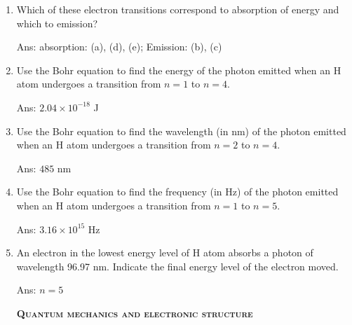 \documentclass[main.tex]{subfiles}
\begin{document}
\begin{multicols*}{2}
\begin{enumerate}
\item Which of these electron transitions correspond to absorption of energy and which to emission?
\begin{enumerate}[label=(\alph*)]\end{enumerate}
  \begin{flushright}\small Ans:  absorption: (a), (d), (e); Emission: (b), (c)  \end{flushright}



\item Use the Bohr equation to  find the energy of the photon emitted when an H atom undergoes a transition from $n=1$ to $n=4$.
  \begin{flushright}\small Ans:  $2.04\times10^{-18}$ J  \end{flushright}

\item Use the Bohr equation to  find the wavelength (in nm) of the photon emitted when an H atom undergoes a transition from $n=2$ to $n=4$.
  \begin{flushright}\small Ans:  $485$ nm \end{flushright}

\item Use the Bohr equation to  find the frequency (in Hz) of the photon emitted when an H atom undergoes a transition from $n=1$ to $n=5$.
  \begin{flushright}\small Ans:  $3.16\times10^{15}$ Hz \end{flushright}


\item An electron in the lowest energy level of H atom absorbs a photon of wavelength 96.97 nm. Indicate the final energy level of the electron moved.
  \begin{flushright}\small Ans:  $n=5$ \end{flushright}

{\raggedright\textsc{\textbf{Quantum mechanics and electronic structure }}\par}



\end{enumerate}
\end{multicols*}
\end{document}
